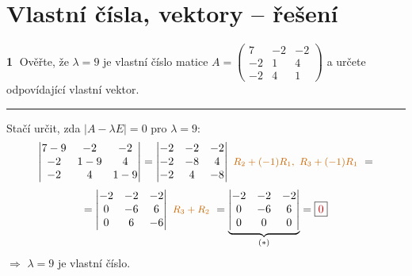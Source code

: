 \documentclass[10pt,a4paper]{article}
\newcommand{\vysl}[1]{\boxed{\color{red!75!black}#1}}
\newcommand{\pozn}[1]{{\color{red!75!black}#1}}
\newcommand{\krok}[1]{\text{\small\color{orange!80!black}#1}}
\begin{document}
\section*{Vlastní čísla, vektory -- řešení}

\textbf{\textcircled{1}} Ověřte, že $\lambda=9$ je vlastní číslo matice
$A=\begin{pmatrix} 7 & -2 & -2\\ -2 & 1 & 4\\ -2 & 4 & 1 \end{pmatrix}$
a určete odpovídající vlastní vektor.

\hrule
\medskip
{\color{blue!60!black}Stačí určit, zda $|A-\lambda E|=0$ pro $\lambda=9$:}
\[
\begin{vmatrix} 7-9 & -2 & -2\\ -2 & 1-9 & 4\\ -2 & 4 & 1-9 \end{vmatrix}
= \begin{vmatrix} -2 & -2 & -2\\ -2 & -8 & 4\\ -2 & 4 & -8 \end{vmatrix}
\ \krok{$R_2+(-1)R_1,\ R_3+(-1)R_1$}\ =
\]
\[
= \begin{vmatrix} -2 & -2 & -2\\ 0 & -6 & 6\\ 0 & 6 & -6 \end{vmatrix}
\ \krok{$R_3+R_2$}\ =
\underbrace{\begin{vmatrix} -2 & -2 & -2\\ 0 & -6 & 6\\ 0 & 0 & 0 \end{vmatrix}}_{(*)}
= \vysl{0}
\]
$\Rightarrow$ \pozn{$\lambda=9$ je vlastní číslo.}
\end{document}
